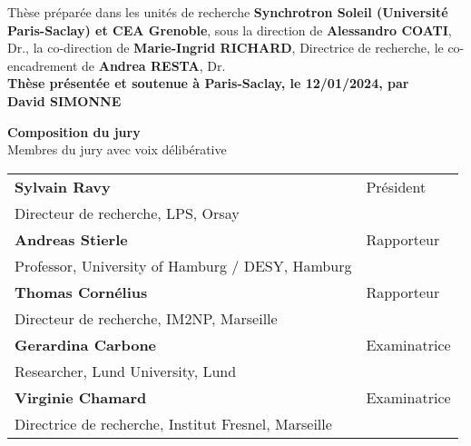 \begin{titlepage}
\footnotesize Thèse préparée dans les unités de recherche \textbf{Synchrotron Soleil (Université Paris-Saclay) et CEA Grenoble}, sous la direction de \textbf{Alessandro COATI}, Dr., la co-direction de \textbf{Marie-Ingrid RICHARD}, Directrice de recherche, le co-encadrement de \textbf{Andrea RESTA}, Dr.\\
\vspace{15mm}
\textbf{Thèse présentée et soutenue à Paris-Saclay, le 12/01/2024, par}\\
\bigskip
\Large {\color{Prune} \textbf{David SIMONNE}}

\vspace{\fill} %

\bigskip
\flushleft
\small {\color{Prune} \textbf{Composition du jury}}\\
{\color{Prune} \scriptsize {Membres du jury avec voix délibérative}} \\
\vspace{2mm}
\scriptsize
\begin{tabular}{|p{10cm}l}
\arrayrulecolor{Prune}
\textbf{Sylvain Ravy} & Président \\
Directeur de recherche, LPS, Orsay & \\
\textbf{Andreas Stierle} & Rapporteur \\
Professor, University of Hamburg / DESY, Hamburg & \\
\textbf{Thomas Cornélius} & Rapporteur \\
Directeur de recherche, IM2NP, Marseille & \\
\textbf{Gerardina Carbone} & Examinatrice \\
Researcher, Lund University, Lund & \\
\textbf{Virginie Chamard} & Examinatrice \\
Directrice de recherche, Institut Fresnel, Marseille & \\
\end{tabular}
\vspace{6mm}

\end{titlepage}